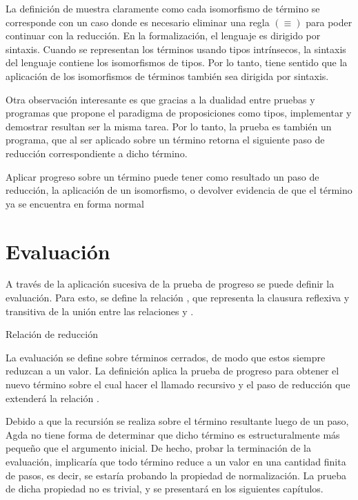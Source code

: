 La definición de  muestra claramente como cada isomorfismo de término se corresponde con un caso donde es necesario eliminar una regla $(\equiv)$ para poder continuar con la reducción.
En la formalización, el lenguaje es dirigido por sintaxis.
Cuando se representan los términos usando tipos intrínsecos, la sintaxis del lenguaje contiene los isomorfismos de tipos.
Por lo tanto, tiene sentido que la aplicación de los isomorfismos de términos también sea dirigida por sintaxis.

Otra observación interesante es que gracias a la dualidad entre pruebas y programas que propone el paradigma de proposiciones como tipos, implementar y demostrar resultan ser la misma tarea.
Por lo tanto, la prueba  es también un programa, que al ser aplicado sobre un término retorna el siguiente paso de reducción correspondiente a dicho término.

\begin{example}
	Aplicar progreso sobre un término puede tener como resultado un paso de reducción, la aplicación de un isomorfismo, o devolver evidencia de que el término ya se encuentra en forma normal
\end{example}

\section{Evaluación}

A través de la aplicación sucesiva de la prueba de progreso se puede definir la evaluación.
Para esto, se define la relación \type{$\_\rightsquigarrow\_$}, que representa la clausura reflexiva y transitiva de la unión entre las relaciones \type{$\_\hookrightarrow\_$} y \type{$\_\rightleftarrows\_$}.

\begin{codigo}
	Relación de reducción
\end{codigo}

La evaluación se define sobre términos cerrados, de modo que estos siempre reduzcan a un valor.
La definición aplica la prueba de progreso para obtener el nuevo término sobre el cual hacer el llamado recursivo y el paso de reducción que extenderá la relación \type{$\_\rightsquigarrow\_$}.

Debido a que la recursión se realiza sobre el término resultante luego de un paso, Agda no tiene forma de determinar que dicho término es estructuralmente más pequeño que el argumento inicial.
De hecho, probar la terminación de la evaluación, implicaría que todo término reduce a un valor en una cantidad finita de pasos, es decir, se estaría probando la propiedad de normalización.
La prueba de dicha propiedad no es trivial, y se presentará en los siguientes capítulos.

